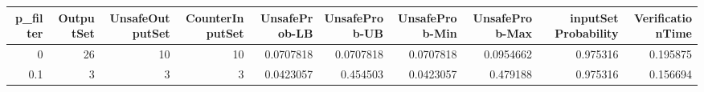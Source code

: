 \begin{tabular}{rrrrrrrrrr}
\hline
   p\_filter &   OutputSet &   UnsafeOutputSet &   CounterInputSet &   UnsafeProb-LB &   UnsafeProb-UB &   UnsafeProb-Min &   UnsafeProb-Max &   inputSet Probability &   VerificationTime \\
\hline
        0   &          26 &                10 &                10 &       0.0707818 &       0.0707818 &        0.0707818 &        0.0954662 &               0.975316 &           0.195875 \\
        0.1 &           3 &                 3 &                 3 &       0.0423057 &       0.454503  &        0.0423057 &        0.479188  &               0.975316 &           0.156694 \\
\hline
\end{tabular}
